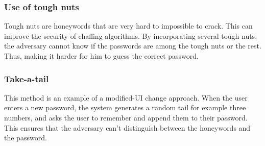 \documentclass[../main.tex]{subfiles}
\begin{document}
\subsubsection{Use of tough nuts}
Tough nuts are honeywords that are very hard to impossible to crack. This can
improve the security of chaffing algorithms. By incorporating several tough
nuts, the adversary cannot know if the passwords are among the tough
nuts or the rest. Thus, making it harder for him to guess the correct password.

\subsubsection{Take-a-tail}
This method is an example of a modified-UI change approach. When the user enters
a new password, the system generates a random tail for example three numbers, and
asks the user to remember and append them to their password. This ensures that the
adversary can't distinguish between the honeywords and the password.
\end{document}

